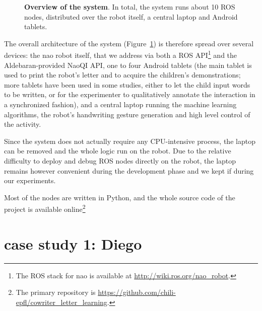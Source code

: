 \documentclass{sig-alternate}
\begin{document}
\begin{figure}[ht!]
{
}

\caption{\small \textbf{Overview of the system}. In total, the system runs about 10 ROS nodes,
    distributed over the robot itself, a central laptop and Android tablets.}

    \label{fig:archi}
\end{figure}

The overall architecture of the system (Figure~\ref{fig:archi}) is therefore
spread over several devices: the {\sc nao} robot itself, that we address via
both a ROS API\footnote{The ROS stack for {\sc nao} is available at
\url{http://wiki.ros.org/nao_robot}.} and the Aldebaran-provided NaoQI API, one
to four Android tablets (the main tablet is used to print the robot's letter and
to acquire the children's demonstrations; more tablets have been used in some
studies, either to let the child input words to be written, or for the
experimenter to qualitatively annotate the interaction in a synchronized
fashion), and a central laptop running the machine learning algorithms, the
robot's handwriting gesture generation and high level control of the activity.

Since the system does not actually require any CPU-intensive process, the laptop
can be removed and the whole logic run on the robot. Due to the relative
difficulty to deploy and debug ROS nodes directly on the robot, the laptop
remains however convenient during the development phase and we kept if during
our experiments.

Most of the nodes are written in Python, and the whole source code of the
project is available online\footnote{The primary repository is
\url{https://github.com/chili-epfl/cowriter_letter_learning}.}


\section{case study 1: Diego}
\end{document}

